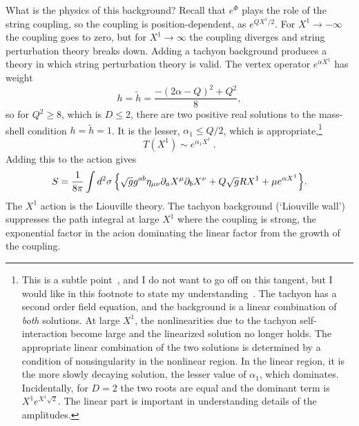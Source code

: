 What is the physics of this background?  Recall that $e^\Phi$ plays
the role of the string coupling, so the coupling is
position-dependent, as $e^{Q X^1/2}$.  For $X^1 \to -\infty$ the 
coupling goes to zero, but for $X^1 \to \infty$ the coupling diverges
and string perturbation theory breaks down.  Adding a tachyon
background produces a theory in which string
perturbation theory is valid.  The vertex operator $e^{\alpha X^1}$
has weight 
\begin{equation}
h = \tilde h = \frac{-(2\alpha - Q)^2 + Q^2}{8},  \label{lvert}
\end{equation}
so for $Q^2 \geq 8$, which is $D \leq 2$, there are two positive
real solutions to the mass-shell condition $h = \tilde h
= 1$. It is the lesser,
$\alpha_1 \leq Q/2$, which is appropriate,\footnote{This is a
subtle point~\cite{Sliou}, and I do not want to
go off on this tangent, but I would like in this footnote to state
my understanding~\cite{Pliou}.  The tachyon has a second order field equation,
and the background is a linear combination of {\it both}
solutions.  At large
$X^1$, the nonlinearities due to the tachyon self-interaction become
large and the linearized solution no longer holds.  The appropriate
linear combination of the two solutions is determined by a condition
of nonsingularity in the nonlinear region.  In the linear region,
it is the more slowly decaying solution, the
lesser value of $\alpha_1$, which dominates. Incidentally, for $D=2$
the two roots are equal and the dominant term is $X^1 e^{X^1
\sqrt{2}}.$  The linear part is important in understanding details
of the amplitudes.}
\begin{equation}
T(X^1) \sim e^{\alpha_1 X^1}\ .  \label{tachback}
\end{equation}
Adding this
to the action gives
\begin{equation}
S = \frac{1}{8 \pi } \int d^2\sigma \, \Bigl\{ 
\sqrt{g} g^{ab} \eta_{\mu\nu} \partial_a X^\mu
\partial_b X^\nu  + Q \sqrt{g} R X^1 + \mu e^{\alpha X^1} \Bigr\}. 
\label{diltach}
\end{equation}
The $X^1$ action is the Liouville theory.  The tachyon background
(`Liouville wall')
suppresses the path integral at large $X^1$ where the coupling is
strong, the exponential factor in the acion dominating the linear factor
from the growth of the coupling.

